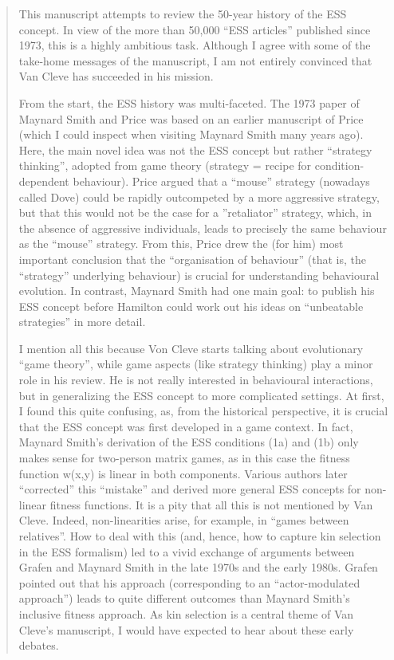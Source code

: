 \documentclass[10pt,parskip=full,foldmarks=off,addrfield=off,backaddress=false,refline=dateleft,letterpaper]{scrlttr2}
\newenvironment{reviewerquote}{\begin{quote}\color{DarkBlue}\itshape}{\end{quote}}
\begin{document}
\begin{letter}
\begin{reviewerquote}

This manuscript attempts to review the 50-year history of the ESS concept. In view of the more than 50,000 “ESS articles” published since 1973, this is a highly ambitious task. Although I agree with some of the take-home messages of the manuscript, I am not entirely convinced that Van Cleve has succeeded in his mission.

From the start, the ESS history was multi-faceted. The 1973 paper of Maynard Smith and Price was based on an earlier manuscript of Price (which I could inspect when visiting Maynard Smith many years ago). Here, the main novel idea was not the ESS concept but rather “strategy thinking”, adopted from game theory (strategy = recipe for condition-dependent behaviour). Price argued that a “mouse” strategy (nowadays called Dove) could be rapidly outcompeted by a more aggressive strategy, but that this would not be the case for a ”retaliator” strategy, which, in the absence of aggressive individuals, leads to precisely the same behaviour as the “mouse” strategy. From this, Price drew the (for him) most important conclusion that the “organisation of behaviour” (that is, the “strategy” underlying behaviour) is crucial for understanding behavioural evolution. In contrast, Maynard Smith had one main goal: to publish his ESS concept before Hamilton could work out his ideas on “unbeatable strategies” in more detail.

I mention all this because Von Cleve starts talking about evolutionary “game theory”, while game aspects (like strategy thinking) play a minor role in his review. He is not really interested in behavioural interactions, but in generalizing the ESS concept to more complicated settings. At first, I found this quite confusing, as, from the historical perspective, it is crucial that the ESS concept was first developed in a game context. In fact, Maynard Smith’s derivation of the ESS conditions (1a) and (1b) only makes sense for two-person matrix games, as in this case the fitness function w(x,y) is linear in both components. Various authors later “corrected” this “mistake” and derived more general ESS concepts for non-linear fitness functions. It is a pity that all this is not mentioned by Van Cleve. Indeed, non-linearities arise, for example, in “games between relatives”. How to deal with this (and, hence, how to capture kin selection in the ESS formalism) led to a vivid exchange of arguments between Grafen and Maynard Smith in the late 1970s and the early 1980s. Grafen pointed out that his approach (corresponding to an “actor-modulated approach”) leads to quite different outcomes than Maynard Smith’s inclusive fitness approach. As kin selection is a central theme of Van Cleve’s manuscript, I would have expected to hear about these early debates.


\end{reviewerquote}
\end{letter}
\end{document}
